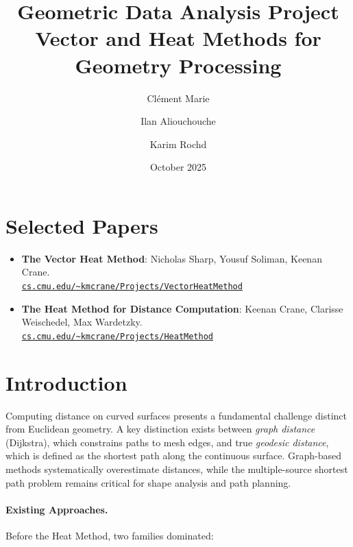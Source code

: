 \documentclass[11pt,a4paper]{article}
\title{\Large Geometric Data Analysis Project \\[0.3em]
\textbf{Vector and Heat Methods for Geometry Processing}}
\author{
Clément Marie \and Ilan Aliouchouche \and Karim Rochd
}
\date{October 2025}
\begin{document}
\maketitle

\section*{Selected Papers}

\begin{itemize}[nosep] %
    \item \textbf{The Vector Heat Method}: Nicholas Sharp, Yousuf Soliman, Keenan Crane.\\
    \href{https://www.cs.cmu.edu/~kmcrane/Projects/VectorHeatMethod/index.html}{\texttt{cs.cmu.edu/\~{}kmcrane/Projects/VectorHeatMethod}}

    \medskip
    \item \textbf{The Heat Method for Distance Computation}: Keenan Crane, Clarisse Weischedel, Max Wardetzky.\\
    \href{https://www.cs.cmu.edu/~kmcrane/Projects/HeatMethod/index.html}{\texttt{cs.cmu.edu/\~{}kmcrane/Projects/HeatMethod}}
\end{itemize}

\newpage
\tableofcontents
\newpage

\twocolumn

\section{Introduction}

Computing distance on curved surfaces presents a fundamental challenge distinct from Euclidean geometry. A key distinction exists between \textit{graph distance} (Dijkstra), which constrains paths to mesh edges, and true \textit{geodesic distance}, which is defined as the shortest path along the continuous surface. Graph-based methods systematically overestimate distances, while the multiple-source shortest path problem remains critical for shape analysis and path planning.

\paragraph{Existing Approaches.}
Before the Heat Method, two families dominated:
\end{document}
